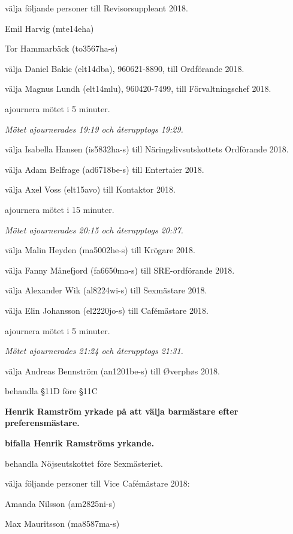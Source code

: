 \documentclass[10pt]{article}
\begin{document}
\begin{paragrafer}
\begin{paralist}
    \Mba välja följande personer till Revisorsuppleant 2018.
    \begin{tightdashlist}
        \item Emil Harvig (mte14eha)
        \item Tor Hammarbäck (to3567ha-s)
    \end{tightdashlist}

    \Mba välja Daniel Bakic (elt14dba), 960621-8890, till Ordförande 2018.

    \Mba välja Magnus Lundh (elt14mlu), 960420-7499, till Förvaltningschef 2018.

    \Mba ajournera mötet i 5 minuter.

    \emph{Mötet ajournerades 19:19 och återupptogs 19:29.}

    \Mba välja Isabella Hansen (is5832ha-s) till Näringslivsutskottets Ordförande 2018.

    \Mba välja Adam Belfrage (ad6718be-s) till Entertaier 2018.

    \Mba välja Axel Voss (elt15avo) till Kontaktor 2018.

    \Mba ajournera mötet i 15 minuter.

    \emph{Mötet ajournerades 20:15 och återupptogs 20:37.}

    \Mba välja Malin Heyden (ma5002he-s) till Krögare 2018.

    \Mba välja Fanny Månefjord (fa6650ma-s) till SRE-ordförande 2018.

    \Mba välja Alexander Wik (al8224wi-s) till Sexmästare 2018.

    \Mba välja Elin Johansson (el2220jo-s) till Cafémästare 2018.

    \Mba ajournera mötet i 5 minuter.

    \emph{Mötet ajournerades 21:24 och återupptogs 21:31.}

    \Mba välja Andreas Bennström (an1201be-s) till Øverphøs 2018.

    \Mba behandla \S11D före \S11C


    \textbf{Henrik Ramström yrkade på att välja barmästare efter preferensmästare.}

    \textbf{\Mba bifalla Henrik Ramströms yrkande.}

    \Mba behandla Nöjseutskottet före Sexmästeriet.

    \Mba välja följande personer till Vice Cafémästare 2018:
    \begin{tightdashlist}
        \item Amanda Nilsson (am2825ni-s)
        \item Max Mauritsson (ma8587ma-s)
    \end{tightdashlist}


\end{paralist}
\end{paragrafer}
\end{document}
